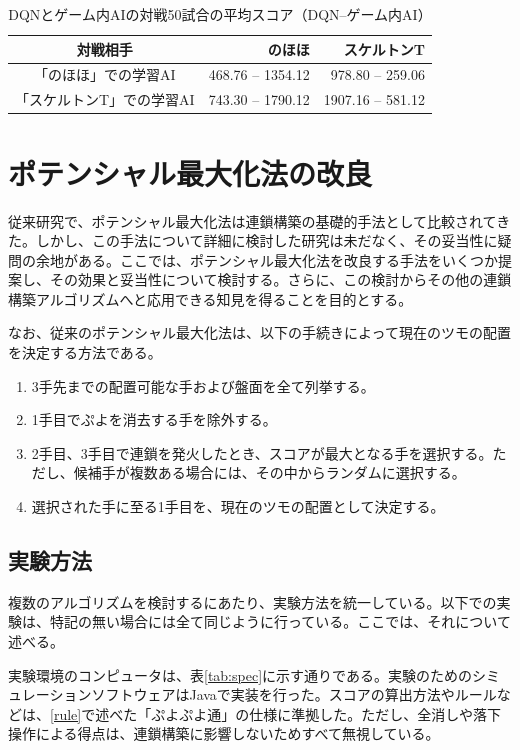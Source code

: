 \documentclass[12pt]{jreport}
\begin{document}
\begin{table}[tb]
\begin{center}
\caption{DQNとゲーム内AIの対戦50試合の平均スコア（DQN--ゲーム内AI）} \label{tab:dqn_score_vs}
\begin{tabular}{|c|r|r|} \hline
対戦相手 & のほほ & スケルトンT\\ \hline
「のほほ」での学習AI & 468.76 -- 1354.12 & 978.80 -- 259.06\\ \hline
「スケルトンT」での学習AI & 743.30 -- 1790.12 & 1907.16 -- 581.12\\ \hline
\end{tabular}
\end{center}
\end{table}


\chapter{ポテンシャル最大化法の改良} \label{potential} \setcounter{section}{0}
従来研究で、ポテンシャル最大化法は連鎖構築の基礎的手法として比較されてきた。しかし、この手法について詳細に検討した研究は未だなく、その妥当性に疑問の余地がある。ここでは、ポテンシャル最大化法を改良する手法をいくつか提案し、その効果と妥当性について検討する。さらに、この検討からその他の連鎖構築アルゴリズムへと応用できる知見を得ることを目的とする。

なお、従来のポテンシャル最大化法は、以下の手続きによって現在のツモの配置を決定する方法である。
\begin{enumerate}
\item 3手先までの配置可能な手および盤面を全て列挙する。
\item 1手目でぷよを消去する手を除外する。
\item 2手目、3手目で連鎖を発火したとき、スコアが最大となる手を選択する。ただし、候補手が複数ある場合には、その中からランダムに選択する。
\item 選択された手に至る1手目を、現在のツモの配置として決定する。
\end{enumerate}

\section{実験方法}
複数のアルゴリズムを検討するにあたり、実験方法を統一している。以下での実験は、特記の無い場合には全て同じように行っている。ここでは、それについて述べる。

実験環境のコンピュータは、表\ref{tab:spec}に示す通りである。実験のためのシミュレーションソフトウェアはJavaで実装を行った。スコアの算出方法やルールなどは、\ref{rule}で述べた「ぷよぷよ通」の仕様に準拠した。ただし、全消しや落下操作による得点は、連鎖構築に影響しないためすべて無視している。
\end{document}
